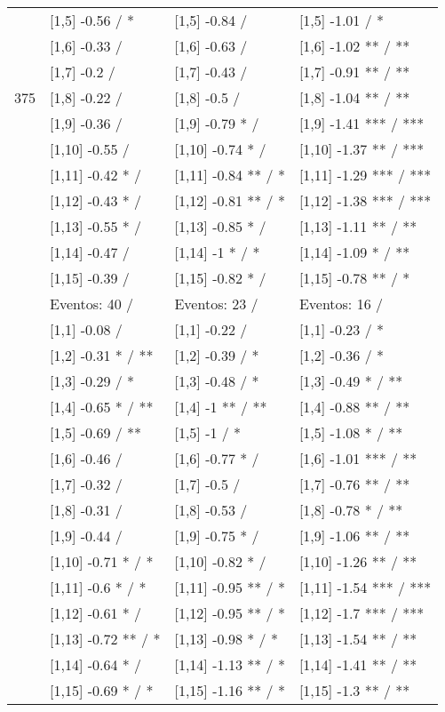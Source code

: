 \begin{table}
\begin{tabular}[t]{llll}
 & {}[1,5] -0.56  / * & {}[1,5] -0.84  / & {}[1,5] -1.01  / *\\
 & {}[1,6] -0.33  / & {}[1,6] -0.63  / & {}[1,6] -1.02 ** / **\\
 & {}[1,7] -0.2  / & {}[1,7] -0.43  / & {}[1,7] -0.91 ** / **\\
375 & {}[1,8] -0.22  / & {}[1,8] -0.5  / & {}[1,8] -1.04 ** / **\\
\addlinespace
 & {}[1,9] -0.36  / & {}[1,9] -0.79 * / & {}[1,9] -1.41 *** / ***\\
 & {}[1,10] -0.55  / & {}[1,10] -0.74 * / & {}[1,10] -1.37 ** / ***\\
 & {}[1,11] -0.42 * / & {}[1,11] -0.84 ** / * & {}[1,11] -1.29 *** / ***\\
 & {}[1,12] -0.43 * / & {}[1,12] -0.81 ** / * & {}[1,12] -1.38 *** / ***\\
 & {}[1,13] -0.55 * / & {}[1,13] -0.85 * / & {}[1,13] -1.11 ** / **\\
\addlinespace
 & {}[1,14] -0.47  / & {}[1,14] -1 * / * & {}[1,14] -1.09 * / **\\
 & {}[1,15] -0.39  / & {}[1,15] -0.82 * / & {}[1,15] -0.78 ** / *\\
 & Eventos:  40 / & Eventos:  23 / & Eventos:  16 /\\
 & {}[1,1] -0.08  / & {}[1,1] -0.22  / & {}[1,1] -0.23  / *\\
 & {}[1,2] -0.31 * / ** & {}[1,2] -0.39  / * & {}[1,2] -0.36  / *\\
\addlinespace
 & {}[1,3] -0.29  / * & {}[1,3] -0.48  / * & {}[1,3] -0.49 * / **\\
 & {}[1,4] -0.65 * / ** & {}[1,4] -1 ** / ** & {}[1,4] -0.88 ** / **\\
 & {}[1,5] -0.69  / ** & {}[1,5] -1  / * & {}[1,5] -1.08 * / **\\
 & {}[1,6] -0.46  / & {}[1,6] -0.77 * / & {}[1,6] -1.01 *** / **\\
 & {}[1,7] -0.32  / & {}[1,7] -0.5  / & {}[1,7] -0.76 ** / **\\
\addlinespace
500 & {}[1,8] -0.31  / & {}[1,8] -0.53  / & {}[1,8] -0.78 * / **\\
 & {}[1,9] -0.44  / & {}[1,9] -0.75 * / & {}[1,9] -1.06 ** / **\\
 & {}[1,10] -0.71 * / * & {}[1,10] -0.82 * / & {}[1,10] -1.26 ** / **\\
 & {}[1,11] -0.6 * / * & {}[1,11] -0.95 ** / * & {}[1,11] -1.54 *** / ***\\
 & {}[1,12] -0.61 * / & {}[1,12] -0.95 ** / * & {}[1,12] -1.7 *** / ***\\
\addlinespace
 & {}[1,13] -0.72 ** / * & {}[1,13] -0.98 * / * & {}[1,13] -1.54 ** / **\\
 & {}[1,14] -0.64 * / & {}[1,14] -1.13 ** / * & {}[1,14] -1.41 ** / **\\
 & {}[1,15] -0.69 * / * & {}[1,15] -1.16 ** / * & {}[1,15] -1.3 ** / **\\
\bottomrule
\end{tabular}
\end{table}
